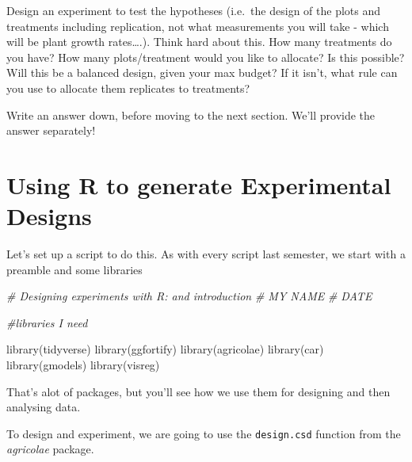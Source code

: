 \documentclass[
]{book}
\newenvironment{Shaded}{\begin{snugshade}}{\end{snugshade}}
\newcommand{\AttributeTok}[1]{\textcolor[rgb]{0.77,0.63,0.00}{#1}}
\newcommand{\CommentTok}[1]{\textcolor[rgb]{0.56,0.35,0.01}{\textit{#1}}}
\newcommand{\DecValTok}[1]{\textcolor[rgb]{0.00,0.00,0.81}{#1}}
\newcommand{\FunctionTok}[1]{\textcolor[rgb]{0.00,0.00,0.00}{#1}}
\newcommand{\NormalTok}[1]{#1}
\newcommand{\OtherTok}[1]{\textcolor[rgb]{0.56,0.35,0.01}{#1}}
\newcommand{\StringTok}[1]{\textcolor[rgb]{0.31,0.60,0.02}{#1}}
\begin{document}
Design an experiment to test the hypotheses (i.e.~the design of the plots and treatments including replication, not what measurements you will take - which will be plant growth rates\ldots.). Think hard about this. How many treatments do you have? How many plots/treatment would you like to allocate? Is this possible? Will this be a balanced design, given your max budget? If it isn't, what rule can you use to allocate them replicates to treatments?

Write an answer down, before moving to the next section. We'll provide the answer separately!

\hypertarget{using-r-to-generate-experimental-designs}{%
\section{Using R to generate Experimental Designs}\label{using-r-to-generate-experimental-designs}}

Let's set up a script to do this. As with every script last semester, we start with a preamble and some libraries

\begin{Shaded}
\begin{Highlighting}[]
\CommentTok{\# Designing experiments with R: and introduction}
\CommentTok{\# MY NAME}
\CommentTok{\# DATE}

\CommentTok{\#libraries I need}

\FunctionTok{library}\NormalTok{(tidyverse)}
\FunctionTok{library}\NormalTok{(ggfortify)}
\FunctionTok{library}\NormalTok{(agricolae)}
\FunctionTok{library}\NormalTok{(car)}
\FunctionTok{library}\NormalTok{(gmodels)}
\FunctionTok{library}\NormalTok{(visreg)}
\end{Highlighting}
\end{Shaded}

That's alot of packages, but you'll see how we use them for designing and then analysing data.

To design and experiment, we are going to use the \texttt{design.csd} function from the \emph{agricolae} package.

\begin{Shaded}
\end{Shaded}
\end{document}
